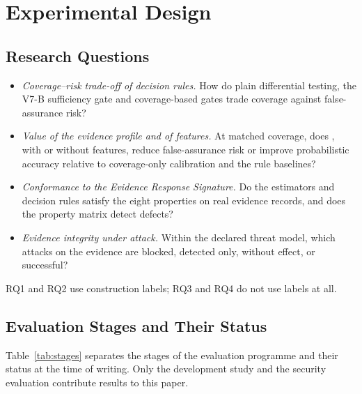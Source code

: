 \section{Experimental Design}\label{sec:design}

\subsection{Research Questions}
\begin{itemize}
\item[RQ1)] \emph{Coverage--risk trade-off of decision rules.} How do plain differential testing, the V7-B sufficiency gate and coverage-based gates trade \NDO{} coverage against false-assurance risk?
\item[RQ2)] \emph{Value of the evidence profile and of \ers{} features.} At matched coverage, does \cec{}, with or without \ers{} features, reduce false-assurance risk or improve probabilistic accuracy relative to coverage-only calibration and the rule baselines?
\item[RQ3)] \emph{Conformance to the Evidence Response Signature.} Do the \sbg{} estimators and decision rules satisfy the eight \ers{} properties on real evidence records, and does the property matrix detect defects?
\item[RQ4)] \emph{Evidence integrity under attack.} Within the declared threat model, which attacks on the evidence are blocked, detected only, without effect, or successful?
\end{itemize}
RQ1 and RQ2 use construction labels; RQ3 and RQ4 do not use labels at all.

\subsection{Evaluation Stages and Their Status}
Table~\ref{tab:stages} separates the stages of the evaluation programme and their status at the time of writing. Only the development study and the security evaluation contribute results to this paper.


